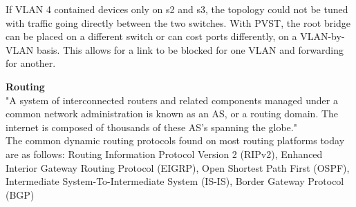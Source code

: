 \documentclass{article}
\begin{document}
If VLAN 4 contained devices only on s2 and s3, the topology could not be tuned with traffic going directly between the two switches. With PVST, the root bridge can be placed on a different switch or can cost ports differently, on a VLAN-by-VLAN basis. This allows for a link to be blocked for one VLAN and forwarding for another.

\newpage
\noindent\textbf{Routing}\\

"A system of interconnected routers and related components managed under a common network administration is known as an AS, or a routing domain. The internet is composed of thousands of these AS's spanning the globe."\\

The common dynamic routing protocols found on most routing platforms today are as follows: Routing Information Protocol Version 2 (RIPv2), Enhanced Interior Gateway Routing Protocol (EIGRP), Open Shortest Path First (OSPF), Intermediate System-To-Intermediate System (IS-IS), Border Gateway Protocol (BGP)\\
\end{document}
